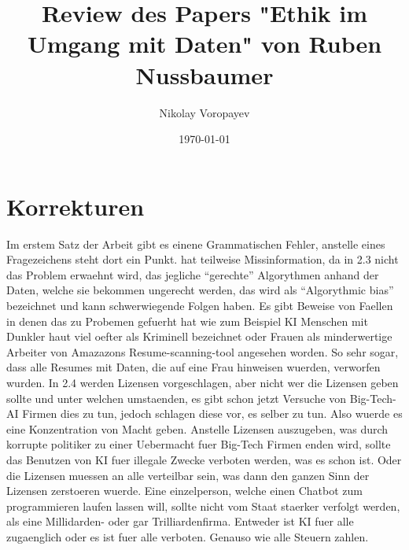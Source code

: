 \documentclass{article}
\title{Review des Papers "Ethik im Umgang mit Daten" von Ruben Nussbaumer}
\author{Nikolay Voropayev}
\date{\today}
\begin{document}
\maketitle

\newpage

\section{Korrekturen}
Im erstem Satz der Arbeit gibt es einene Grammatischen Fehler, anstelle eines Fragezeichens steht dort ein Punkt.
\newline
{} hat teilweise Missinformation, da in 2.3 nicht das Problem erwaehnt wird, das jegliche \enquote{gerechte} Algorythmen anhand der Daten, welche sie bekommen ungerecht werden, das wird als \enquote{Algorythmic bias} bezeichnet und kann schwerwiegende Folgen haben. Es gibt Beweise von Faellen in denen das zu Probemen gefuerht hat wie zum Beispiel KI Menschen mit Dunkler haut viel oefter als Kriminell bezeichnet oder Frauen als minderwertige Arbeiter von Amazazons Resume-scanning-tool angesehen worden. So sehr sogar, dass alle Resumes mit Daten, die auf eine Frau hinweisen wuerden, verworfen wurden. 
\newline
\citep{algorythmic-bias}
\newline
\citep{ai-social-credit-scores}
\newline
\citep{criminal-screening-ai-bias}
\newline
\citep{amazon-hiring-ai-bias}
\newline
\newline
In 2.4 werden Lizensen vorgeschlagen, aber nicht wer die Lizensen geben sollte und unter welchen umstaenden, es gibt schon jetzt Versuche von Big-Tech-AI Firmen dies zu tun, jedoch schlagen diese vor, es selber zu tun. Also wuerde es eine Konzentration von Macht geben. Anstelle Lizensen auszugeben, was durch korrupte politiker zu einer Uebermacht fuer Big-Tech Firmen enden wird, sollte das Benutzen von KI fuer illegale Zwecke verboten werden, was es schon ist. Oder die Lizensen muessen an alle verteilbar sein, was dann den ganzen Sinn der Lizensen zerstoeren wuerde. Eine einzelperson, welche einen Chatbot zum programmieren laufen lassen will, sollte nicht vom Staat staerker verfolgt werden, als eine Millidarden- oder gar Trilliardenfirma. Entweder ist KI fuer alle zugaenglich oder es ist fuer alle verboten. Genauso wie alle Steuern zahlen.
\end{document}
